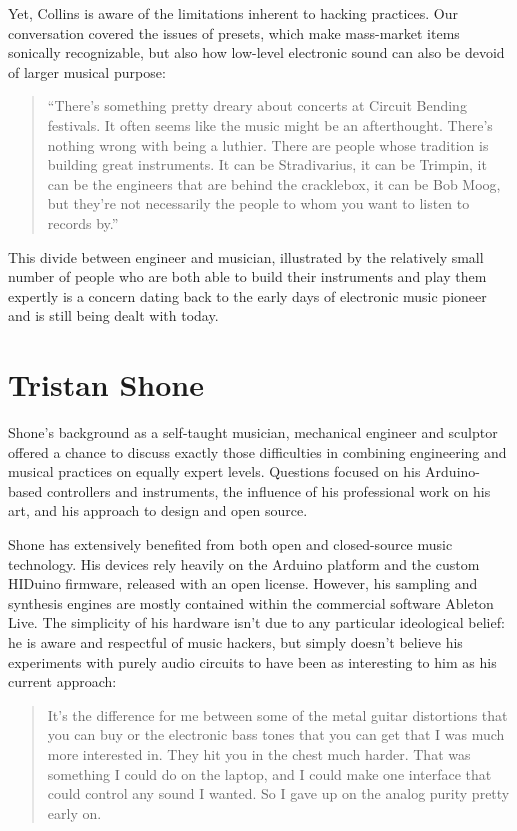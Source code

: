 Yet, Collins is aware of the limitations inherent to hacking practices. Our conversation covered the issues of presets, which make mass-market items sonically recognizable, but also how low-level electronic sound can also be devoid of larger musical purpose: 

\begin{quote}
	
	``There’s something pretty dreary about concerts at Circuit Bending festivals. It often seems like the music might be an afterthought. There’s nothing wrong with being a luthier. There are people whose tradition is building great instruments. It can be Stradivarius, it can be Trimpin, it can be the engineers that are behind the cracklebox, it can be Bob Moog, but they’re not necessarily the people to whom you want to listen to records by.''
	
	\end{quote}
	
This divide between engineer and musician, illustrated by the relatively small number of people who are both able to build their instruments and play them expertly is a concern dating back to the early days of electronic music pioneer and is still being dealt with today. 

\section{Tristan Shone}

Shone's background as a self-taught musician, mechanical engineer and sculptor offered a chance to discuss exactly those difficulties in combining engineering and musical practices on equally expert levels. Questions focused on his Arduino-based controllers and instruments, the influence of his professional work on his art, and his approach to design and open source. 

Shone has extensively benefited from both open and closed-source music technology. His devices rely heavily on the Arduino platform and the custom HIDuino firmware, released with an open license. However, his sampling and synthesis engines are mostly contained within the commercial software Ableton Live. The simplicity of his hardware isn't due to any particular ideological belief: he is aware and respectful of music hackers, but simply doesn't believe his experiments with purely audio circuits to have been as interesting to him as his current approach: 

\begin{quote}
	It’s the difference for me between some of the metal guitar distortions that you can buy or the electronic bass tones that you can get that I was much more interested in. They hit you in the chest much harder. That was something I could do on the laptop, and I could make one interface that could control any sound I wanted. So I gave up on the analog purity pretty early on.
\end{quote}

